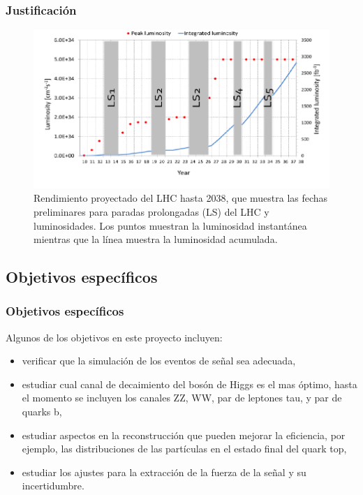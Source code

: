 \documentclass[11pt]{beamer}
\begin{document}
\begin{frame}
\frametitle{Justificaci\'on}
	\begin{center}
		\begin{figure}
			\includegraphics[width=\linewidth]{lum.png}
			\caption{ Rendimiento proyectado del LHC hasta 2038, que muestra las fechas
				preliminares para paradas prolongadas (LS) del LHC y luminosidades. Los puntos
				muestran la luminosidad instantánea mientras que la línea muestra la
				luminosidad acumulada.}
		\end{figure}
	\end{center}
\end{frame}


\begin{frame}
\subsection{Objetivos espec\'ificos}
\frametitle{Objetivos espec\'ificos}
Algunos de los objetivos en este proyecto incluyen:
\begin{itemize}
	\item verificar que la simulación de los eventos de señal sea adecuada,
	\item estudiar cual canal de decaimiento del bosón de Higgs es el mas \'optimo, hasta el
	momento se incluyen los canales ZZ, WW, par de leptones tau, y par de quarks b,
	\item estudiar aspectos en la reconstrucción que pueden mejorar la eficiencia, por
	ejemplo, las distribuciones de las partículas en el estado final del quark top,
	\item estudiar los ajustes para la extracción de la fuerza de la señal y su incertidumbre.
\end{itemize}
\end{frame}
\end{document}
